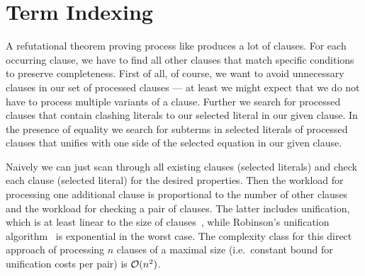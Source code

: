 











\section{Term Indexing}








A refutational theorem proving process like \InstGenEQ{} produces a lot of clauses.
For each occurring clause, we have to find
all other clauses that match specific conditions to preserve completeness.
First of all, of course, we want to avoid unnecessary clauses in our set of processed clauses
--- at least we might expect that we do not have to process multiple variants of a clause.
Further we search for processed clauses that contain clashing literals to our selected literal in our given clause.
In the presence of equality we search for subterms in selected literals of processed clauses that unifies with one side of the selected equation in our given clause.

Naively we can just scan through all existing clauses (selected literals)
and check each clause (selected literal) for the desired properties.
	Then the workload for processing one additional clause is proportional to the number of other clauses and
	the workload for checking a pair of clauses.
	The latter includes unification, which is at least linear to the size of clauses~\cite{ALBERT19933},
	while Robinson's unification algorithm~\cite{Robinson:1965:MLB:321250.321253} is exponential in the worst case.
	The complexity class for this direct approach of processing \( n \) clauses of a maximal size
	(i.e.\ constant bound for unification costs per pair) is \( \mathcal{O}(n^2) \).

